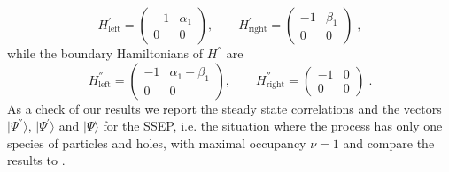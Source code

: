 \documentclass[10pt]{article}
\numberwithin{equation}{section}
\numberwithin{equation}{subsection}
\newcommand{\co}{\;,}
\newcommand{\dt}{\;.}
\begin{document}
{\begin{equation}
	H^{'}_{\text{left}}=\begin{pmatrix}
		-1&\alpha_{1}\\
		0&0
	\end{pmatrix},\qquad H^{'}_{\text{right}}=\begin{pmatrix}
	-1&\beta_{1}\\
	0&0
\end{pmatrix}\co
\end{equation}
while the boundary Hamiltonians of $H^{''}$ are
\begin{equation}
	H^{''}_{\text{left}}=\begin{pmatrix}
		-1&\alpha_{1}-\beta_{1}\\
		0&0
	\end{pmatrix},\qquad H^{''}_{\text{right}}=\begin{pmatrix}
	-1&0\\
	0&0
\end{pmatrix}\dt
\end{equation}
{As a check of our results we report the steady state correlations and the vectors $|\Psi^{''}\rangle$, $|\Psi^{'}\rangle$ and $|\Psi\rangle$ for the SSEP, i.e. the situation where the process has only one species of particles and holes, with maximal occupancy $\nu=1$ and compare the results to \cite{frassek2020eigenstates}. }
}
\end{document}
